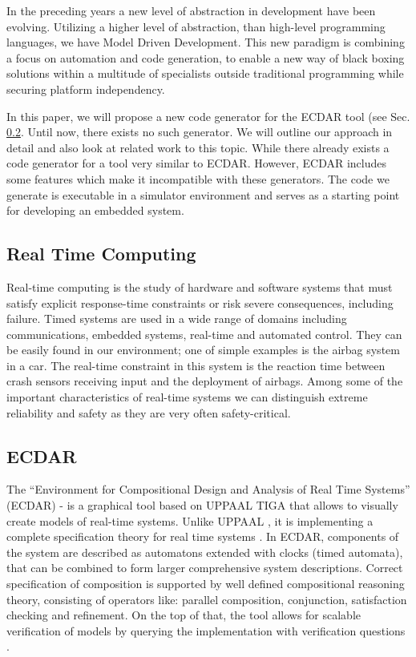 In the preceding years a new level of abstraction in development have been
evolving. Utilizing a higher level of abstraction, than high-level programming
languages, we have Model Driven Development. This new paradigm is combining a
focus on automation and code generation, to enable a new way of black boxing
solutions within a multitude of specialists outside traditional programming
while securing platform independency.

In this paper, we will propose a new code generator for the ECDAR tool (see
Sec. \ref{introduction-ecdar}. Until now, there exists no such generator. We
will outline our approach in detail and also look at related work to this
topic. While there already exists a code generator for a tool very similar to
ECDAR. However, ECDAR includes some features which make it incompatible with
these generators. The code we generate is executable in a simulator environment
and serves as a starting point for developing an embedded system.

\subsection {Real Time Computing}
\label{introduction-rts}

Real-time computing is the study of hardware and software systems that must
satisfy explicit response-time constraints or risk severe consequences,
including failure. Timed systems are used in a wide range of domains including
communications, embedded systems, real-time and automated control.  They can be
easily found in our environment; one of simple examples is the airbag system in
a car.  The real-time constraint in this system is the reaction time between
crash sensors receiving input and the deployment of airbags. Among some of the
important characteristics of real-time systems we can distinguish extreme
reliability and safety as they are very often safety-critical.

\subsection{ECDAR}
\label{introduction-ecdar}

The ``Environment for Compositional Design and Analysis of Real Time Systems''
(ECDAR) - is a graphical tool based on UPPAAL TIGA
\cite{behrmann_uppaal-tiga:_2006} that allows to visually create models of
real-time systems. Unlike UPPAAL \cite{larsen_uppaal_1997}, it is implementing a
complete specification theory for real time systems
\cite{David:2010:TIA:1755952.1755967,conf/atva/DavidLLNW10}. In ECDAR,
components of the system are described as automatons extended with clocks (timed
automata), that can be combined to form larger comprehensive system
descriptions. Correct specification of composition is supported by well defined
compositional reasoning theory, consisting of operators like: parallel
composition, conjunction, satisfaction checking and refinement. On the top of
that, the tool allows for scalable verification of models by querying the
implementation with verification questions \cite{conf/atva/DavidLLNW10}.


